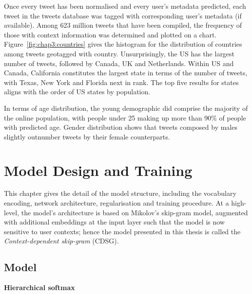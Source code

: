 \documentclass[a4paper,12pt,twoside,openright]{report}
\newcommand{\tb}{\vspace{10pt} \textbf}
\newcommand{\ti}{\textit}
\begin{document}
Once every tweet has been normalised and every user's metadata predicted, each tweet in the tweets database was tagged with corresponding user's metadata (if available). Among 623 million tweets that have been compiled, the frequency of those with context information was determined and plotted on a chart. Figure~\ref{fig:chap3:countries} gives the histogram for the distribution of countries among tweets geotagged with country. Unsurprisingly, the US has the largest number of tweets, followed by Canada, UK and Netherlands. Within US and Canada, California constitutes the largest state in terms of the number of tweets, with Texas, New York and Florida next in rank. The top five results for states aligns with the order of US states by population. 

In terms of age distribution, the young demographic did comprise the majority of the online population, with people under 25 making up more than 90\% of people with predicted age. Gender distribution shows that tweets composed by males slightly outnumber tweets by their female counterparts.



\chapter{Model Design and Training} 
\label{ch4}

This chapter gives the detail of the model structure, including the vocabulary encoding, network architecture, regularisation and training procedure. At a high-level, the model's architecture is based on Mikolov's skip-gram model, augmented with additional embeddings at the input layer such that the model is now sensitive to user contexts; hence the model presented in this thesis is called the \ti{Context-dependent skip-gram} (CDSG).

\section{Model}

\tb{Hierarchical softmax}
\end{document}
